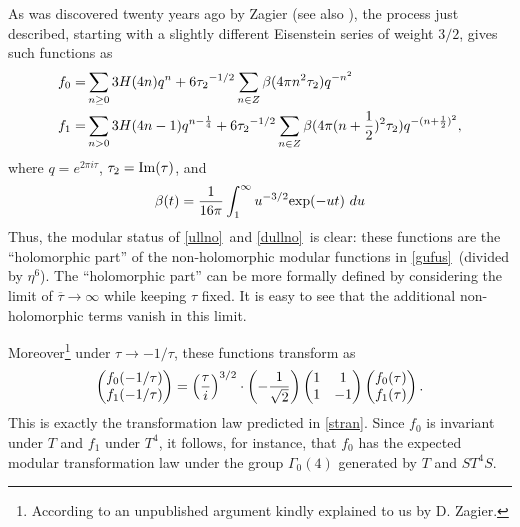 \documentclass[12pt]{article}
\numberwithin{equation}{section}
\def\bar{\overline}
\begin{document}
As was discovered twenty years ago by Zagier
\cite{zag} (see also \cite{hirzag} ),
the process just described, starting with a slightly different
Eisenstein series of weight $3/2$, gives such functions as
%
\begin{equation}
  \label{gufus}
  \begin{aligned}f_0=&\sum_{n\geq 0}3H(4n) q^{n}+
    6{\tau_2}^{-1/2}\sum_{n\in Z} \beta (4\pi n^2\tau_2 )
    q^{-n^2}\\ f_1=&\sum_{n>0} 3H(4n-1)q^{n-{1\over 4}}+
    6{\tau_2}^{-1/2}\sum_{n\in Z} \beta (4\pi (n+{1\over 2})^2 \tau_2
    ) q^{-(n+{1\over 2})^2},\\
  \end{aligned}
\end{equation}
%
where $q=e^{2\pi i \tau}$, $\tau_2={\rm Im}(\tau)$, and
%
$$\beta (t)={1\over 16 \pi}\int_1^\infty u^{-3/2} {\rm exp}(-u t)\ du$$
%
Thus, the modular status of \eqref{ullno}\ and \eqref{dullno}\ is clear:
these functions are the ``holomorphic part'' of the
non-holomorphic modular functions in \eqref{gufus}\ (divided
by $\eta^6$).   The ``holomorphic part''
can be more formally defined by
considering the limit of $\bar \tau \rightarrow \infty$ while
keeping $\tau$ fixed.  It is easy to see that the
additional non-holomorphic terms vanish in this limit.

Moreover\footnote{According to an unpublished argument kindly
explained to us by D. Zagier.}
under $\tau\to- 1/\tau$, these functions transform
as
\begin{equation}
  \label{sonsp}
  \begin{pmatrix}f_0(-1/\tau) \\ f_1(-1/\tau)\\
  \end{pmatrix} =\left({\tau\over i} \right)^{3/2}\cdot\left(-{1\over
  \sqrt 2}\right)
  \begin{pmatrix} 1 & 1\\ 1 & -1\\
  \end{pmatrix}
  \begin{pmatrix}f_0(\tau) \\ f_1(\tau)\\
  \end{pmatrix}.
\end{equation}
This is exactly the transformation law predicted in \eqref{stran}.
Since $f_0$ is invariant under $T$
and $f_1$ under $T^4$, it follows, for
instance, that $f_0$ has the expected modular transformation law
under the group $\Gamma_0(4)$ generated by $T$ and $ST^4S$.
\end{document}
